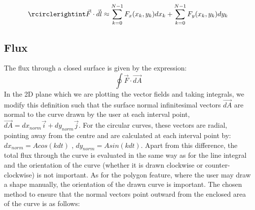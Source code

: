\documentclass[12pt]{report}
\begin{document}
\begin{equation}
	\rcirclerightint \vec{F} \cdot \vec{dl} \approx \sum_{k=0}^{N-1} F_x(x_k,y_k)dx_k + \sum_{k=0}^{N-1} F_y(x_k,y_k)dy_k
\end{equation}

\subsection{Flux}

The flux through a closed surface is given by the expression:
\begin{equation}
	\oint \vec{F} \cdot \vec{dA}
\end{equation}
In the 2D plane which we are plotting the vector fields and taking integrals, we modify this definition such that the surface normal infinitesimal vectors $\vec{dA}$ are normal to the curve drawn by the user at each interval point, $\vec{dA} = dx_{norm}\vec{i} + dy_{norm}\vec{j}$. For the circular curves, these vectors are radial, pointing away from the centre and are calculated at each interval point by: $dx_{norm} = Acos(kdt)$ , $dy_{norm} = Asin(kdt)$. Apart from this difference, the total flux through the curve is evaluated in the same way as for the line integral and the orientation of the curve (whether it is drawn clockwise or counter-clockwise) is not important. As for the polygon feature, where the user may draw a shape manually, the orientation of the drawn curve is important. The chosen method to ensure that the normal vectors point outward from the enclosed area of the curve is as follows:
\end{document}
